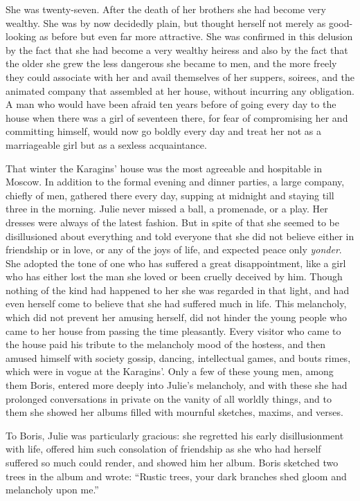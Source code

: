 She was twenty-seven. After the death of her brothers she had
become very wealthy. She was by now decidedly plain, but thought
herself not merely as good-looking as before but even far more
attractive. She was confirmed in this delusion by the fact that
she had become a very wealthy heiress and also by the fact that
the older she grew the less dangerous she became to men, and the
more freely they could associate with her and avail themselves of
her suppers, soirees, and the animated company that assembled at
her house, without incurring any obligation. A man who would have
been afraid ten years before of going every day to the house when
there was a girl of seventeen there, for fear of compromising her
and committing himself, would now go boldly every day and treat
her not as a marriageable girl but as a sexless acquaintance.

That winter the Karagins' house was the most agreeable and
hospitable in Moscow. In addition to the formal evening and
dinner parties, a large company, chiefly of men, gathered there
every day, supping at midnight and staying till three in the
morning. Julie never missed a ball, a promenade, or a play. Her
dresses were always of the latest fashion. But in spite of that
she seemed to be disillusioned about everything and told everyone
that she did not believe either in friendship or in love, or any
of the joys of life, and expected peace only \emph{yonder}. She
adopted the tone of one who has suffered a great disappointment,
like a girl who has either lost the man she loved or been cruelly
deceived by him. Though nothing of the kind had happened to her
she was regarded in that light, and had even herself come to
believe that she had suffered much in life. This melancholy,
which did not prevent her amusing herself, did not hinder the
young people who came to her house from passing the time
pleasantly. Every visitor who came to the house paid his tribute
to the melancholy mood of the hostess, and then amused himself
with society gossip, dancing, intellectual games, and bouts
rimes, which were in vogue at the Karagins'. Only a few of these
young men, among them Boris, entered more deeply into Julie's
melancholy, and with these she had prolonged conversations in
private on the vanity of all worldly things, and to them she
showed her albums filled with mournful sketches, maxims, and
verses.

To Boris, Julie was particularly gracious: she regretted his
early disillusionment with life, offered him such consolation of
friendship as she who had herself suffered so much could render,
and showed him her album. Boris sketched two trees in the album
and wrote: ``Rustic trees, your dark branches shed gloom and
melancholy upon me.''

